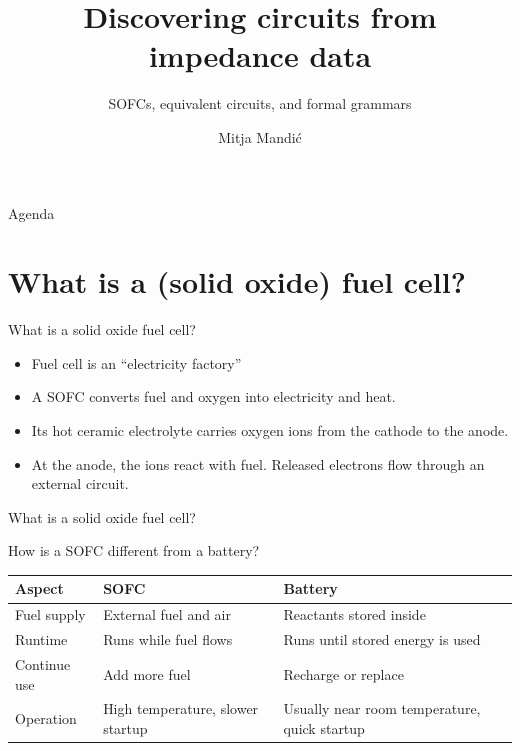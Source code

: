 \documentclass[aspectratio=169,12pt]{beamer}
\title{Discovering circuits from impedance data}
\subtitle{SOFCs, equivalent circuits, and formal grammars}
\author{Mitja Mandić}
\institute{IJS E8}
\date{}
\begin{document}
\begin{frame}[plain]
  \titlepage
\end{frame}

\begin{frame}
  {Agenda}
  \tableofcontents
\end{frame}

\section{What is a (solid oxide) fuel cell?}


\begin{frame}{What is a solid oxide fuel cell?}
  \begin{itemize}
    \setlength{\itemsep}{0.95em}
    \item Fuel cell is an ``electricity factory''
    \item A SOFC converts fuel and oxygen into electricity and heat.
    \item Its hot ceramic electrolyte carries oxygen ions from the cathode to the anode.
    \item At the anode, the ions react with fuel. Released electrons flow through an external circuit. 
  \end{itemize}
\end{frame}

\begin{frame}{What is a solid oxide fuel cell?}
\end{frame}

\begin{frame}{How is a SOFC different from a battery?}
  \renewcommand{\arraystretch}{1.55}
  \begin{tabularx}{\textwidth}{@{}>{\raggedright\arraybackslash}p{}>{\raggedright\arraybackslash}X>{\raggedright\arraybackslash}X@{}}
    \toprule
    \textbf{Aspect} & \textbf{SOFC} & \textbf{Battery} \\
    \midrule
    Fuel supply
      & External fuel and air
      & Reactants stored inside \\
    Runtime
      & Runs while fuel flows
      & Runs until stored energy is used \\
    Continue use
      & Add more fuel
      & Recharge or replace \\
    Operation
      & High temperature, slower startup
      & Usually near room temperature, quick startup \\
    \bottomrule
  \end{tabularx}
\end{frame}
\end{document}
